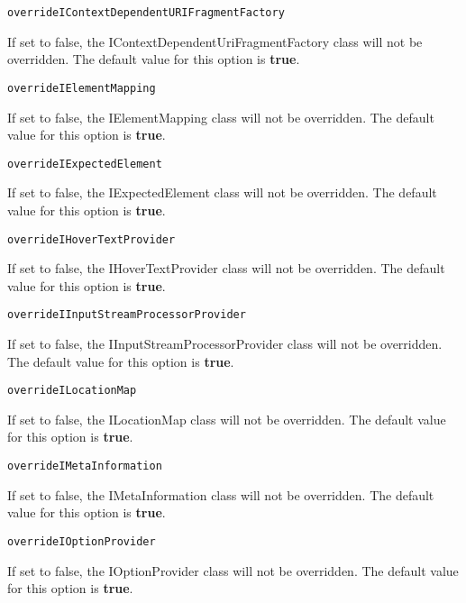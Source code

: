 \noindent\texttt{overrideIContextDependentURIFragmentFactory}
\begin{myindentpar}{1cm}
If set to false, the IContextDependentUriFragmentFactory class will not be overridden. The default value for this option is \textbf{true}.
\end{myindentpar}

\noindent\texttt{overrideIElementMapping}
\begin{myindentpar}{1cm}
If set to false, the IElementMapping class will not be overridden. The default value for this option is \textbf{true}.
\end{myindentpar}

\noindent\texttt{overrideIExpectedElement}
\begin{myindentpar}{1cm}
If set to false, the IExpectedElement class will not be overridden. The default value for this option is \textbf{true}.
\end{myindentpar}

\noindent\texttt{overrideIHoverTextProvider}
\begin{myindentpar}{1cm}
If set to false, the IHoverTextProvider class will not be overridden. The default value for this option is \textbf{true}.
\end{myindentpar}

\noindent\texttt{overrideIInputStreamProcessorProvider}
\begin{myindentpar}{1cm}
If set to false, the IInputStreamProcessorProvider class will not be overridden. The default value for this option is \textbf{true}.
\end{myindentpar}

\noindent\texttt{overrideILocationMap}
\begin{myindentpar}{1cm}
If set to false, the ILocationMap class will not be overridden. The default value for this option is \textbf{true}.
\end{myindentpar}

\noindent\texttt{overrideIMetaInformation}
\begin{myindentpar}{1cm}
If set to false, the IMetaInformation class will not be overridden. The default value for this option is \textbf{true}.
\end{myindentpar}

\noindent\texttt{overrideIOptionProvider}
\begin{myindentpar}{1cm}
If set to false, the IOptionProvider class will not be overridden. The default value for this option is \textbf{true}.
\end{myindentpar}

